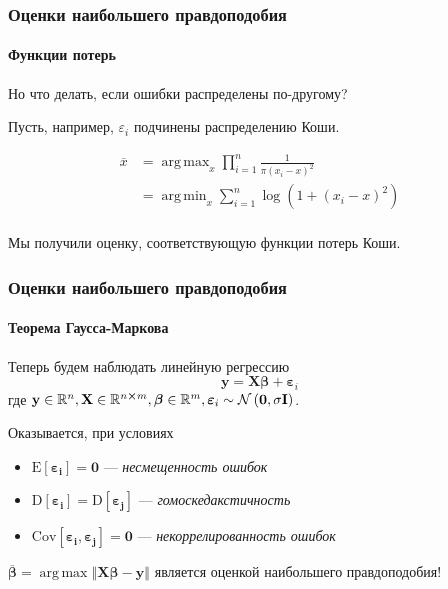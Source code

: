 \documentclass[notheorems,aspectratio=169]{beamer}
\DeclareMathOperator*{\argmax}{arg\,max}
\DeclareMathOperator*{\argmin}{arg\,min}
\begin{document}
\begin{frame}
  \frametitle{Оценки наибольшего правдоподобия}
  \framesubtitle{Функции потерь}
  Но что делать, если ошибки распределены по-другому?

  Пусть, например, $\varepsilon_i$ подчинены распределению Коши.

  \begin{align*}
    \overline{x} & =\argmax_{x}\prod_{i=1}^n\frac{1}{\pi \left(x_i-x\right)^2} \\
                 & =\argmin_{x}\sum_{i=1}^n \log\left(1+\left(x_i-x\right)^2\right) \\
  \end{align*}
  
  Мы получили оценку, соответствующую функции потерь Коши.
\end{frame}

\begin{frame}
  \frametitle{Оценки наибольшего правдоподобия}
  \framesubtitle{Теорема Гаусса-Маркова}
  Теперь будем наблюдать линейную регрессию 
  $$\mathbf{y}=\mathbf{X}\boldsymbol{\beta}+\boldsymbol{\varepsilon}_i$$
  где $\mathbf{y}\in\mathbb{R}^n, \mathbf{X}\in\mathbb{R}^{n\cross m}, \boldsymbol{\beta}\in\mathbb{R}^m, \boldsymbol{\varepsilon}_i\sim\mathcal{N}\left(\mathbf{0},\sigma \mathbf{I}\right)$.

  Оказывается, при условиях

  \begin{itemize}
    \item $\mathrm{E}\left[\boldsymbol{\varepsilon_i}\right]=\mathbf{0}$ --- \emph{несмещенность ошибок}
    \item $\mathrm{D}\left[\boldsymbol{\varepsilon_i}\right]=\mathrm{D}\left[\boldsymbol{\varepsilon_j}\right]$ --- \emph{гомоскедакстичность}
   \item $\mathrm{Cov}\left[\boldsymbol{\varepsilon_i},\boldsymbol{\varepsilon_j}\right]=\mathbf{0}$ --- \emph{некоррелированность ошибок}
  \end{itemize}

  $\overline{\boldsymbol{\beta}}=\argmax{\left\Vert\mathbf{X}\boldsymbol{\beta}-\mathbf{y}\right\Vert}$ является оценкой наибольшего правдоподобия!
\end{frame}
\end{document}
